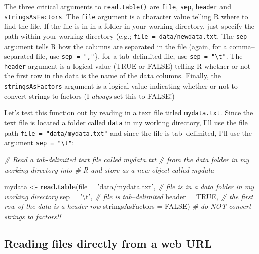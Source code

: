 \documentclass[]{book}
\newenvironment{Shaded}{\begin{snugshade}}{\end{snugshade}}
\newcommand{\KeywordTok}[1]{\textcolor[rgb]{0.13,0.29,0.53}{\textbf{{#1}}}}
\newcommand{\DataTypeTok}[1]{\textcolor[rgb]{0.13,0.29,0.53}{{#1}}}
\newcommand{\CharTok}[1]{\textcolor[rgb]{0.31,0.60,0.02}{{#1}}}
\newcommand{\StringTok}[1]{\textcolor[rgb]{0.31,0.60,0.02}{{#1}}}
\newcommand{\CommentTok}[1]{\textcolor[rgb]{0.56,0.35,0.01}{\textit{{#1}}}}
\newcommand{\OtherTok}[1]{\textcolor[rgb]{0.56,0.35,0.01}{{#1}}}
\newcommand{\NormalTok}[1]{{#1}}
\theoremstyle{definition}
\theoremstyle{definition}
\theoremstyle{remark}
\begin{document}
The three critical arguments to \texttt{read.table()} are \texttt{file},
\texttt{sep}, \texttt{header} and \texttt{stringsAsFactors}. The
\texttt{file} argument is a character value telling R where to find the
file. If the file is in in a folder in your working directory, just
specify the path within your working directory (e.g.;
\texttt{file\ =\ data/newdata.txt}. The \texttt{sep} argument tells R
how the columns are separated in the file (again, for a comma--separated
file, use \texttt{sep\ =\ ","}\}, for a tab--delimited file, use
\texttt{sep\ =\ "\textbackslash{}t"}. The \texttt{header} argument is a
logical value (TRUE or FALSE) telling R whether or not the first row in
the data is the name of the data columns. Finally, the
\texttt{stringsAsFactors} argument is a logical value indicating whether
or not to convert strings to factors (I \emph{always} set this to
FALSE!)

Let's test this function out by reading in a text file titled
\texttt{mydata.txt}. Since the text file is located a folder called
\texttt{data} in my working directory, I'll use the file path
\texttt{file\ =\ "data/mydata.txt"} and since the file is
tab--delimited, I'll use the argument
\texttt{sep\ =\ "\textbackslash{}t"}:

\begin{Shaded}
\begin{Highlighting}[]
\CommentTok{# Read a tab-delimited text file called mydata.txt }
\CommentTok{#  from the data folder in my working directory into}
\CommentTok{#  R and store as a new object called mydata}

\NormalTok{mydata <-}\StringTok{ }\KeywordTok{read.table}\NormalTok{(}\DataTypeTok{file =} \StringTok{'data/mydata.txt'}\NormalTok{,    }\CommentTok{# file is in a data folder in my working directory}
                     \DataTypeTok{sep =} \StringTok{'}\CharTok{\textbackslash{}t}\StringTok{'}\NormalTok{,                  }\CommentTok{# file is tab--delimited}
                     \DataTypeTok{header =} \OtherTok{TRUE}\NormalTok{,               }\CommentTok{# the first row of the data is a header row}
                     \DataTypeTok{stringsAsFactors =} \OtherTok{FALSE}\NormalTok{)    }\CommentTok{# do NOT convert strings to factors!!}
\end{Highlighting}
\end{Shaded}

\subsection{Reading files directly from a web
URL}\label{reading-files-directly-from-a-web-url}
\end{document}
